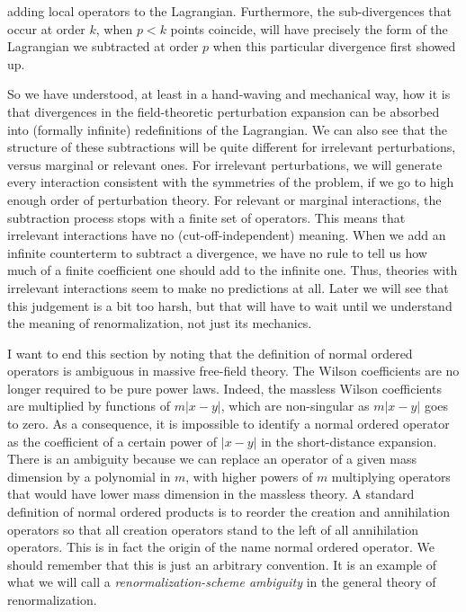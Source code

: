 adding local operators to the Lagrangian. Furthermore, the sub-divergences that
occur at order $k$, when $p<k$ points coincide, will have precisely the form of
the Lagrangian we subtracted at order $p$ when this particular divergence first
showed up.

So we have understood, at least in a hand-waving and mechanical way, how it is
that divergences in the field-theoretic perturbation expansion can be absorbed
into (formally infinite) redefinitions of the Lagrangian. We can also see that
the structure of these subtractions will be quite different for irrelevant
perturbations, versus marginal or relevant ones. For irrelevant perturbations,
we will generate every interaction consistent with the symmetries of the
problem, if we go to high enough order of perturbation theory. For relevant or
marginal interactions, the subtraction process stops with a finite set of
operators. This means that irrelevant interactions have no (cut-off-independent)
meaning. When we add an infinite counterterm to subtract a
divergence, we have no rule to tell us how much of a finite coefficient one
should add to the infinite one. Thus, theories with irrelevant interactions
seem to make no predictions at all. Later we will see that this judgement is a
bit too harsh, but that will have to wait until we understand the meaning of
renormalization, not just its mechanics.

I want to end this section by noting that the definition of normal ordered
operators is ambiguous in massive free-field theory. The Wilson coefficients
are no longer required to be pure power laws. Indeed, the massless Wilson
coefficients are multiplied by functions of $m|x-y|$, which are non-singular as
$m|x-y|$ goes to zero. As a consequence, it is impossible to identify a
normal ordered operator as the coefficient of a certain power of $|x-y|$ in
the short-distance expansion. There is an ambiguity because we can replace an
operator of a given mass dimension by a polynomial in $m$, with higher powers
of $m$ multiplying operators that would have lower mass dimension in the
massless theory. A standard definition of normal ordered products is to
reorder the creation and annihilation operators so that all creation operators
stand to the left of all annihilation operators. This is in fact the origin of
the name normal ordered operator. We should remember that this is just an
arbitrary convention. It is an example of what we will call a
\emph{renormalization-scheme ambiguity} in the general theory of
renormalization.
